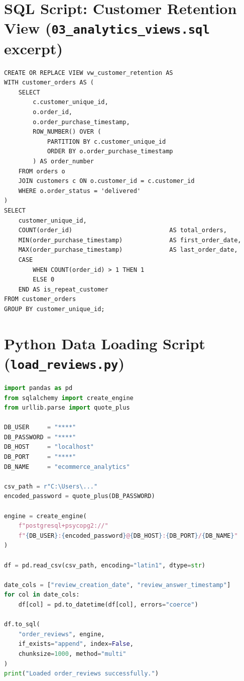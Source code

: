 \documentclass[12pt,a4paper]{article}
\begin{document}
\section{SQL Script: Customer Retention View (\texttt{03\_analytics\_views.sql} excerpt)}
\label{app:retention_view}

\begin{lstlisting}[caption={Customer retention view using \texttt{ROW\_NUMBER()} to identify repeat purchasers.}, label={lst:retention_view}]
CREATE OR REPLACE VIEW vw_customer_retention AS
WITH customer_orders AS (
    SELECT
        c.customer_unique_id,
        o.order_id,
        o.order_purchase_timestamp,
        ROW_NUMBER() OVER (
            PARTITION BY c.customer_unique_id
            ORDER BY o.order_purchase_timestamp
        ) AS order_number
    FROM orders o
    JOIN customers c ON o.customer_id = c.customer_id
    WHERE o.order_status = 'delivered'
)
SELECT
    customer_unique_id,
    COUNT(order_id)                           AS total_orders,
    MIN(order_purchase_timestamp)             AS first_order_date,
    MAX(order_purchase_timestamp)             AS last_order_date,
    CASE
        WHEN COUNT(order_id) > 1 THEN 1
        ELSE 0
    END AS is_repeat_customer
FROM customer_orders
GROUP BY customer_unique_id;
\end{lstlisting}

\section{Python Data Loading Script (\texttt{load\_reviews.py})}
\label{app:load_reviews}

\begin{lstlisting}[language=Python,
    caption={Python script for loading the order reviews CSV into PostgreSQL, handling Latin-1 encoding and timestamp parsing.},
    label={lst:load_reviews},
    keywordstyle=\color{keywordblue}\bfseries,
    stringstyle=\color{red!60!black},
    commentstyle=\color{commentgreen}\itshape]
import pandas as pd
from sqlalchemy import create_engine
from urllib.parse import quote_plus

DB_USER     = "****"
DB_PASSWORD = "****"
DB_HOST     = "localhost"
DB_PORT     = "****"
DB_NAME     = "ecommerce_analytics"

csv_path = r"C:\Users\..."
encoded_password = quote_plus(DB_PASSWORD)

engine = create_engine(
    f"postgresql+psycopg2://"
    f"{DB_USER}:{encoded_password}@{DB_HOST}:{DB_PORT}/{DB_NAME}"
)

df = pd.read_csv(csv_path, encoding="latin1", dtype=str)

date_cols = ["review_creation_date", "review_answer_timestamp"]
for col in date_cols:
    df[col] = pd.to_datetime(df[col], errors="coerce")

df.to_sql(
    "order_reviews", engine,
    if_exists="append", index=False,
    chunksize=1000, method="multi"
)
print("Loaded order_reviews successfully.")
\end{lstlisting}
\end{document}
